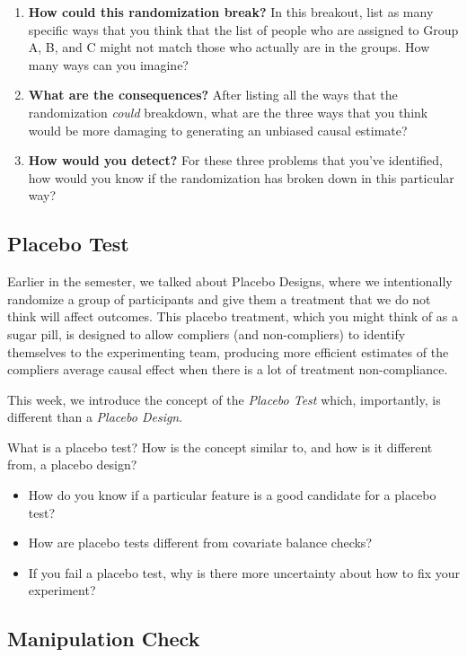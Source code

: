 \documentclass[
]{article}
\providecommand{\tightlist}{%
  \setlength{\itemsep}{0pt}\setlength{\parskip}{0pt}}
\theoremstyle{definition}
\theoremstyle{definition}
\theoremstyle{definition}
\theoremstyle{definition}
\theoremstyle{remark}
\begin{document}
\begin{enumerate}
\def\labelenumi{\arabic{enumi}.}
\tightlist
\item
  \textbf{How could this randomization break?} In this breakout, list as many specific ways that you think that the list of people who are assigned to Group A, B, and C might not match those who actually are in the groups. How many ways can you imagine?
\item
  \textbf{What are the consequences?} After listing all the ways that the randomization \emph{could} breakdown, what are the three ways that you think would be more damaging to generating an unbiased causal estimate?
\item
  \textbf{How would you detect?} For these three problems that you've identified, how would you know if the randomization has broken down in this particular way?
\end{enumerate}

\subsection{Placebo Test}\label{placebo-test}

Earlier in the semester, we talked about Placebo Designs, where we intentionally randomize a group of participants and give them a treatment that we do not think will affect outcomes. This placebo treatment, which you might think of as a sugar pill, is designed to allow compliers (and non-compliers) to identify themselves to the experimenting team, producing more efficient estimates of the compliers average causal effect when there is a lot of treatment non-compliance.

This week, we introduce the concept of the \emph{Placebo Test} which, importantly, is different than a \emph{Placebo Design}.

What is a placebo test? How is the concept similar to, and how is it different from, a placebo design?

\begin{itemize}
\tightlist
\item
  How do you know if a particular feature is a good candidate for a placebo test?
\item
  How are placebo tests different from covariate balance checks?
\item
  If you fail a placebo test, why is there more uncertainty about how to fix your experiment?
\end{itemize}

\subsection{Manipulation Check}\label{manipulation-check}
\end{document}
